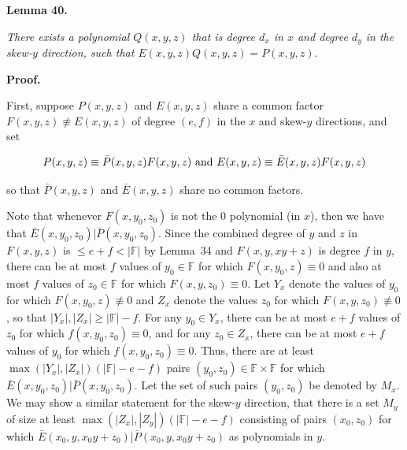 \documentclass[10pt,a4paper]{article}
\begin{document}


\par\medskip\noindent\textbf{
\textbf{Lemma 40}\textbf{.}
}\par



\emph{There exists a polynomial $Q(x,y,z)$ that is degree $d_{x}$ in $x$ and degree $d_{y}$ in the skew-$y$ direction, such that $E(x,y,z)Q(x,y,z)=P(x,y,z).$}\par







\par\medskip\noindent\textbf{Proof.}\par




First, suppose $P(x,y,z)$ and $E(x,y,z)$ share a common factor $F(x,y,z)\not\equiv E(x,y,z)$ of degree $(e,f)$ in the $x$ and skew-$y$ directions, and set\par


\[\begin{gathered}
P(x,y,z)\equiv\bar{P}(x,y,z)F(x,y,z)\nobreak\ \text{and}\nobreak\ E(x,y,z)\equiv\bar{E}(x,y,z)F(x,y,z)
\end{gathered}\]


so that $\bar{P}(x,y,z)$ and $\bar{E}(x,y,z)$ share no common factors.\par




Note that whenever $F(x,y_{0},z_{0})$ is not the $0$ polynomial (in $x$), then we have that $\bar{E}(x,y_{0},z_{0})|\bar{P}(x,y_{0},z_{0})$. Since the combined degree of $y$ and $z$ in $F(x,y,z)$ is $\leq e+f<|\mathbb{F}|$ by Lemma 34 and $F(x,y,xy+z)$ is degree $f$ in $y$, there can be at most $f$ values of $y_{0}\in\mathbb{F}$ for which $F(x,y_{0},z)\equiv 0$ and also at most $f$ values of $z_{0}\in\mathbb{F}$ for which $F(x,y,z_{0})\equiv 0$. Let $Y_{x}$ denote the values of $y_{0}$ for which $F(x,y_{0},z)\not\equiv 0$ and $Z_{x}$ denote the values $z_{0}$ for which $F(x,y,z_{0})\not\equiv 0$, so that $|Y_{x}|,|Z_{x}|\geq|\mathbb{F}|-f$. For any $y_{0}\in Y_{x}$, there can be at most $e+f$ values of $z_{0}$ for which $f(x,y_{0},z_{0})\equiv 0$, and for any $z_{0}\in Z_{x}$, there can be at most $e+f$ values of $y_{0}$ for which $f(x,y_{0},z_{0})\equiv 0$. Thus, there are at least $\max(|Y_{x}|,|Z_{x}|)(|\mathbb{F}|-e-f)$ pairs $(y_{0},z_{0})\in\mathbb{F}\times\mathbb{F}$ for which $\bar{E}(x,y_{0},z_{0})|\bar{P}(x,y_{0},z_{0})$. Let the set of such pairs $(y_{0},z_{0})$ be denoted by $M_{x}$. We may show a similar statement for the skew-$y$ direction, that there is a set $M_{y}$ of size at least $\max(|Z_{x}|,|Z_{y}|)(|\mathbb{F}|-e-f)$ consisting of pairs $(x_{0},z_{0})$ for which $\bar{E}(x_{0},y,x_{0}y+z_{0})|\bar{P}(x_{0},y,x_{0}y+z_{0})$ as polynomials in $y$.\par
\end{document}

